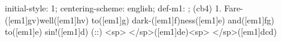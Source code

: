 initial-style: 1;
centering-scheme: english;
def-m1: \grealign;
(cb4) 1. Fare-([em1]gv)well([em1]hv) to([em1]g) dark-([em1]f)ness([em1]e) and([em1]fg) to([em1]e) sin!([em1]d) (::) <sp> </sp>([em1]de)<sp> </sp>([em1]dcd)